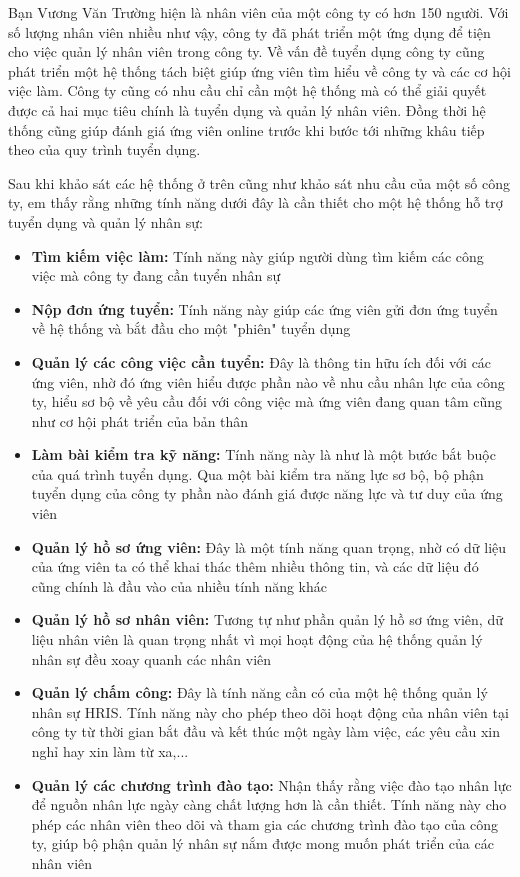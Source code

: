 \documentclass[../DoAn.tex]{subfiles}
\begin{document}
Bạn Vương Văn Trường hiện là nhân viên của một công ty có hơn 150 người. Với số lượng nhân viên nhiều như vậy, công ty đã phát triển một ứng dụng để tiện cho việc quản lý nhân viên trong công ty. Về vấn đề tuyển dụng công ty cũng phát triển một hệ thống tách biệt giúp ứng viên tìm hiểu về công ty và các cơ hội việc làm. Công ty cũng có nhu cầu chỉ cần một hệ thống mà có thể giải quyết được cả hai mục tiêu chính là tuyển dụng và quản lý nhân viên. Đồng thời hệ thống cũng giúp đánh giá ứng viên online trước khi bước tới những khâu tiếp theo của quy trình tuyển dụng. 

Sau khi khảo sát các hệ thống ở trên cũng như khảo sát nhu cầu của một số công ty, em thấy rằng những tính năng dưới đây là cần thiết cho một hệ thống hỗ trợ tuyển dụng và quản lý nhân sự:

\begin{itemize}
\item \textbf{Tìm kiếm việc làm:} Tính năng này giúp người dùng tìm kiếm các công việc mà công ty đang cần tuyển nhân sự
\item \textbf{Nộp đơn ứng tuyển:} Tính năng này giúp các ứng viên gửi đơn ứng tuyển về hệ thống và bắt đầu cho một "phiên" tuyển dụng
\item \textbf{Quản lý các công việc cần tuyển:} Đây là thông tin hữu ích đối với các ứng viên, nhờ đó ứng viên hiểu được phần nào về nhu cầu nhân lực của công ty, hiểu sơ bộ về yêu cầu đối với công việc mà ứng viên đang quan tâm cũng như cơ hội phát triển của bản thân
\item \textbf{Làm bài kiểm tra kỹ năng:} Tính năng này là như là một bước bắt buộc của quá trình tuyển dụng. Qua một bài kiểm tra năng lực sơ bộ, bộ phận tuyển dụng của công ty phần nào đánh giá được năng lực và tư duy của ứng viên
\item \textbf{Quản lý hồ sơ ứng viên:} Đây là một tính năng quan trọng, nhờ có dữ liệu của ứng viên ta có thể khai thác thêm nhiều thông tin, và các dữ liệu đó cũng chính là đầu vào của nhiều tính năng khác
\item \textbf{Quản lý hồ sơ nhân viên:} Tương tự như phần quản lý hồ sơ ứng viên, dữ liệu nhân viên là quan trọng nhất vì mọi hoạt động của hệ thống quản lý nhân sự đều xoay quanh các nhân viên
\item \textbf{Quản lý chấm công:} Đây là tính năng cần có của một hệ thống quản lý nhân sự HRIS. Tính năng này cho phép theo dõi hoạt động của nhân viên tại công ty từ thời gian bắt đầu và kết thúc một ngày làm việc, các yêu cầu xin nghỉ hay xin làm từ xa,...
\item \textbf{Quản lý các chương trình đào tạo:} Nhận thấy rằng việc đào tạo nhân lực để nguồn nhân lực ngày càng chất lượng hơn là cần thiết. Tính năng này cho phép các nhân viên theo dõi và tham gia các chương trình đào tạo của công ty, giúp bộ phận quản lý nhân sự nắm được mong muốn phát triển của các nhân viên

\end{itemize}
\end{document}

